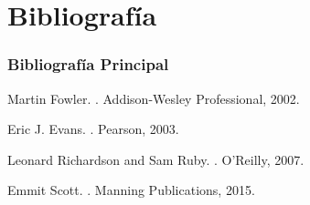 \documentclass[a4paper,t,xcolor=pst,dvips,colortheme]{beamer}
\begin{document}
\section{Bibliografía}

\begin{frame}[c]
	\frametitle{Bibliografía Principal}
    \begin{thebibliography}{1}

Martin Fowler.
.
\newblock Addison-Wesley Professional, 2002.

Eric J. Evans.
.
\newblock Pearson, 2003.

Leonard Richardson and Sam Ruby.
.
\newblock  O'Reilly, 2007.

\bibitem{}
Emmit Scott.
.
\newblock  Manning Publications, 2015.

\end{thebibliography}
\end{frame}
\end{document}
